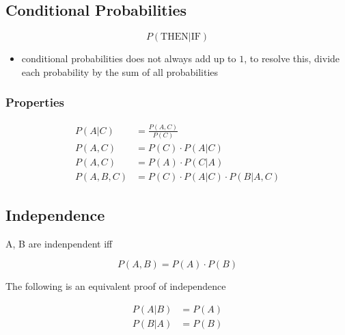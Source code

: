   \subsection{Conditional Probabilities}

    \begin{equation}
      P\left( \text{THEN} | \text{IF} \right)
    \end{equation}

    \begin{itemize}
      \item {} conditional probabilities does not always add up to
      $ 1 $, to resolve this, divide each probability by the sum of all
      probabilities
    \end{itemize}

    \subsubsection{Properties}

      \begin{align}
        P\left( A | C \right) &= \frac{P\left( A, C \right)}{P\left( C \right)} \\
        P\left( A, C \right) &= P(C) \cdot P(A | C) \\
        P\left( A, C \right) &= P(A) \cdot P(C | A) \\
        P\left( A, B, C \right) &= P(C) \cdot P(A | C) \cdot P(B | A, C)
      \end{align}

  \subsection{Independence}

    A, B are indenpendent iff

    \begin{equation}
      P(A, B) = P(A) \cdot P(B)
    \end{equation}

    The following is an equivalent proof of independence

    \begin{align}
      P(A|B) &= P(A) \\
      P(B|A) &= P(B)
    \end{align}
